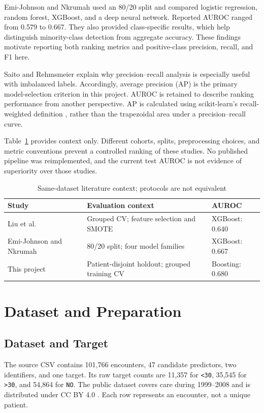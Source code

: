 \documentclass[conference]{IEEEtran}
\begin{document}
Emi-Johnson and Nkrumah \cite{emi} used an 80/20 split and compared logistic regression, random forest, XGBoost, and a deep neural network. Reported AUROC ranged from 0.579 to 0.667. They also provided class-specific results, which help distinguish minority-class detection from aggregate accuracy. These findings motivate reporting both ranking metrics and positive-class precision, recall, and F1 here.

Saito and Rehmsmeier \cite{saito} explain why precision--recall analysis is especially useful with imbalanced labels. Accordingly, average precision (AP) is the primary model-selection criterion in this project. AUROC is retained to describe ranking performance from another perspective. AP is calculated using scikit-learn's recall-weighted definition \cite{ap}, rather than the trapezoidal area under a precision--recall curve.

Table~\ref{tab:literature} provides context only. Different cohorts, splits, preprocessing choices, and metric conventions prevent a controlled ranking of these studies. No published pipeline was reimplemented, and the current test AUROC is not evidence of superiority over those studies.

\begin{table}[!t]
\caption{Same-dataset literature context; protocols are not equivalent}
\label{tab:literature}
\centering
\footnotesize
\begin{tabular}{@{}p{}p{}p{}@{}}
\toprule
Study & Evaluation context & AUROC \\
\midrule
Liu et al. \cite{liu} & Grouped CV; feature selection and SMOTE & XGBoost: 0.640 \\
Emi-Johnson and Nkrumah \cite{emi} & 80/20 split; four model families & XGBoost: 0.667 \\
This project & Patient-disjoint holdout; grouped training CV & Boosting: 0.680 \\
\bottomrule
\end{tabular}
\end{table}

\section{Dataset and Preparation}
\subsection{Dataset and Target}
The source CSV contains 101,766 encounters, 47 candidate predictors, two identifiers, and one target. Its raw target counts are 11,357 for \texttt{<30}, 35,545 for \texttt{>30}, and 54,864 for \texttt{NO}. The public dataset covers care during 1999--2008 and is distributed under CC BY 4.0 \cite{uci}. Each row represents an encounter, not a unique patient.
\end{document}
